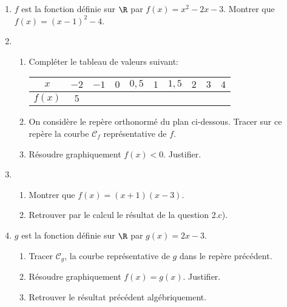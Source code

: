 \documentclass[a4paper]{article}
\begin{document}
  \begin{exerciceinterro}{}{}
  \begin{enumerate}
    \item $f$ est la fonction définie sur $\R$ par $f(x)=x^2-2x-3$. Montrer que $f(x)=(x-1)^2-4$.
    \item  \begin{enumerate}
      \item Compléter le tableau de valeurs suivant:
      \begin{tabular}{|*{10}{c|}}
        \hline
       $x$ & $-2$ & $-1$ & $0$ & $0,5$ & $1$ & $1,5$ & $2$ & $3$ & $4$ \\
       \hline
       $f(x)$ & $5$ & & & & & & & & \\
       \hline
      \end{tabular}
      \item On considère le repère orthonormé du plan ci-dessous. Tracer sur ce repère la courbe $\mathcal{C}_f$ 
      représentative de $f$.
  \begin{center}
  
  \end{center}
  
  \item Résoudre graphiquement $f(x)<0$. Justifier.
    \end{enumerate}
    \item \begin{enumerate}
      \item Montrer que $f(x)=(x+1)(x-3)$.
      \item Retrouver par le calcul le résultat de la question 2.c).
    \end{enumerate}
    \item $g$ est la fonction définie sur $\R$ par $g(x)=2x-3$.
    \begin{enumerate}
      \item Tracer $\mathcal{C}_g$, la courbe représentative de $g$ dans le repère précédent.
      \item Résoudre graphiquement $f(x)=g(x)$. Justifier.
      \item Retrouver le résultat précédent algébriquement.
    \end{enumerate}
  \end{enumerate}
  \end{exerciceinterro}
  
\end{document}
